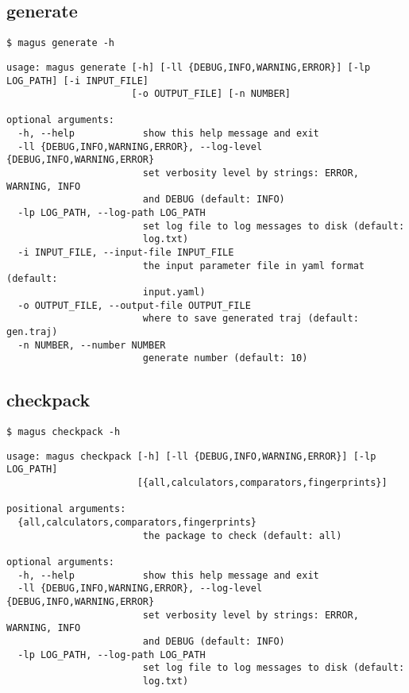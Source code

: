 \documentclass[12pt,oneside]{book}
\begin{document}
\subsection{generate}
\begin{tcolorbox}
    \begin{verbatim}
$ magus generate -h
    \end{verbatim}
    \tcblower
    \begin{verbatim}
usage: magus generate [-h] [-ll {DEBUG,INFO,WARNING,ERROR}] [-lp LOG_PATH] [-i INPUT_FILE]
                      [-o OUTPUT_FILE] [-n NUMBER]
                      
optional arguments:
  -h, --help            show this help message and exit
  -ll {DEBUG,INFO,WARNING,ERROR}, --log-level {DEBUG,INFO,WARNING,ERROR}
                        set verbosity level by strings: ERROR, WARNING, INFO
                        and DEBUG (default: INFO)
  -lp LOG_PATH, --log-path LOG_PATH
                        set log file to log messages to disk (default:
                        log.txt)
  -i INPUT_FILE, --input-file INPUT_FILE
                        the input parameter file in yaml format (default:
                        input.yaml)
  -o OUTPUT_FILE, --output-file OUTPUT_FILE
                        where to save generated traj (default: gen.traj)
  -n NUMBER, --number NUMBER
                        generate number (default: 10)
    \end{verbatim}
\end{tcolorbox}

\subsection{checkpack}
\begin{tcolorbox}
    \begin{verbatim}
$ magus checkpack -h
    \end{verbatim}
    \tcblower
    \begin{verbatim}
usage: magus checkpack [-h] [-ll {DEBUG,INFO,WARNING,ERROR}] [-lp LOG_PATH]
                       [{all,calculators,comparators,fingerprints}]

positional arguments:
  {all,calculators,comparators,fingerprints}
                        the package to check (default: all)

optional arguments:
  -h, --help            show this help message and exit
  -ll {DEBUG,INFO,WARNING,ERROR}, --log-level {DEBUG,INFO,WARNING,ERROR}
                        set verbosity level by strings: ERROR, WARNING, INFO
                        and DEBUG (default: INFO)
  -lp LOG_PATH, --log-path LOG_PATH
                        set log file to log messages to disk (default:
                        log.txt)
    \end{verbatim}
\end{tcolorbox}
\end{document}
